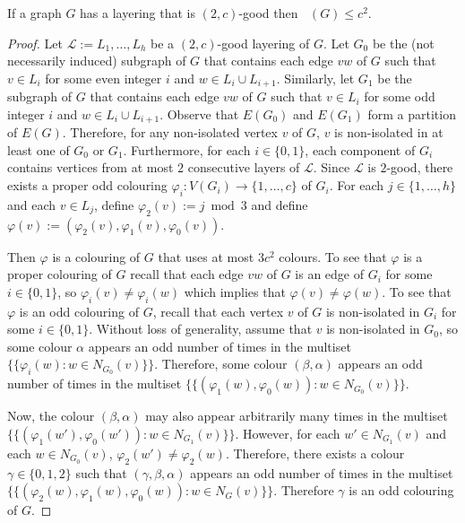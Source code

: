 \documentclass{patmorin}
\DeclareMathOperator{\odd}{\chi_o}
\begin{document}
\begin{lem}
  If a graph $G$ has a layering that is $(2,c)$-good then $\odd(G)\le c^2$.
\end{lem}

\begin{proof}
  Let $\mathcal{L}:=L_1,\ldots,L_h$ be a $(2,c)$-good layering of $G$.  Let $G_0$ be the (not necessarily induced) subgraph of $G$ that contains each edge $vw$ of $G$ such that $v\in L_i$ for some even integer $i$ and $w\in L_i\cup L_{i+1}$.  Similarly, let $G_1$ be the subgraph of $G$ that contains each edge $vw$ of $G$ such that $v\in L_i$ for some odd integer $i$ and $w\in L_i\cup L_{i+1}$.  Observe that $E(G_0)$ and $E(G_1)$ form a partition of $E(G)$.  Therefore, for any non-isolated vertex $v$ of $G$, $v$ is non-isolated in at least one of $G_0$ or $G_1$.  Furthermore, for each $i\in\{0,1\}$, each component of $G_i$ contains vertices from at most $2$ consecutive layers of $\mathcal{L}$.  Since $\mathcal{L}$ is $2$-good, there exists a proper odd colouring $\varphi_i:V(G_i)\to\{1,\ldots,c\}$ of $G_i$.  For each $j\in\{1,\ldots,h\}$ and each $v\in L_j$, define $\varphi_2(v):= j\bmod 3$ and define $\varphi(v):=(\varphi_2(v),\varphi_1(v),\varphi_0(v))$.

  Then $\varphi$ is a colouring of $G$ that uses at most $3c^2$ colours.  To see that $\varphi$ is a proper colouring of $G$ recall that each edge $vw$ of $G$ is an edge of $G_i$ for some $i\in\{0,1\}$, so $\varphi_i(v)\neq\varphi_i(w)$ which implies that $\varphi(v)\neq\varphi(w)$.  To see that $\varphi$ is an odd colouring of $G$, recall that each vertex $v$ of $G$ is non-isolated in $G_i$ for some $i\in\{0,1\}$.  Without loss of generality, assume that $v$ is non-isolated in $G_0$, so some colour $\alpha$ appears an odd number of times in the multiset $\{\{\varphi_i(w):w\in N_{G_0}(v)\}\}$. Therefore, some colour $(\beta,\alpha)$ appears an odd number of times in the multiset $\{\{(\varphi_1(w),\varphi_{0}(w)):w\in N_{G_0}(v)\}\}$.

  Now, the colour $(\beta,\alpha)$ may also appear arbitrarily many times in the multiset $\{\{(\varphi_1(w'),\varphi_{0}(w')):w\in N_{G_{1}}(v)\}\}$.  However, for each $w'\in N_{G_{1}}(v)$ and each $w\in N_{G_0}(v)$, $\varphi_2(w')\neq \varphi_2(w)$.  Therefore, there exists a colour $\gamma\in\{0,1,2\}$ such that $(\gamma,\beta,\alpha)$ appears an odd number of times in the multiset $\{\{(\varphi_2(w),\varphi_1(w),\varphi_{0}(w)):w\in N_{G}(v)\}\}$.  Therefore $\gamma$ is an odd colouring of $G$.
\end{proof}
\end{document}
